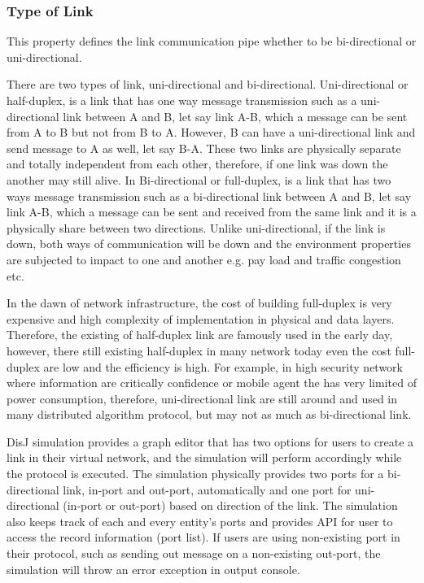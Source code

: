 \subsubsection*{Type of Link}
This property defines the link communication pipe whether to be bi-directional or uni-directional.

There are two types of link, uni-directional and bi-directional. Uni-directional or half-duplex, is a link that has one way message transmission such as a uni-directional link between A and B, let say link A-B, which a message can be sent from A to B but not from B to A. However, B can have a uni-directional link and send message to A as well, let say B-A. These two links are physically separate and totally independent from each other, therefore, if one link was down the another may still alive. In Bi-directional or full-duplex, is a link that has two ways message transmission such as a bi-directional link between A and B, let say link A-B, which a message can be sent and received from the same link and it is a physically share between two directions. Unlike uni-directional, if the link is down, both ways of communication will be down and the environment properties are subjected to impact to one and another e.g. pay load and traffic congestion etc.

In the dawn of network infrastructure, the cost of building full-duplex is very expensive and high complexity of implementation in physical and data layers. Therefore, the existing of half-duplex link are famously used in the early day, however, there still existing half-duplex in many network today even the cost full-duplex are low and the efficiency is high. For example, in high security network where information are critically confidence or mobile agent the has very limited of power consumption, therefore, uni-directional link are still around and used in many distributed algorithm protocol, but may not as much as bi-directional link.

DisJ simulation provides a graph editor that has two options for users to create a link in their virtual network, and the simulation will perform accordingly while the protocol is executed. The simulation physically provides two ports for a bi-directional link, in-port and out-port, automatically and one port for uni-directional (in-port or out-port) based on direction of the link. The simulation also keeps track of each and every entity's ports and provides API for user to access the record information (port list). If users are using non-existing port in their protocol, such as sending out message on a non-existing out-port, the simulation will throw an error exception in output console.

